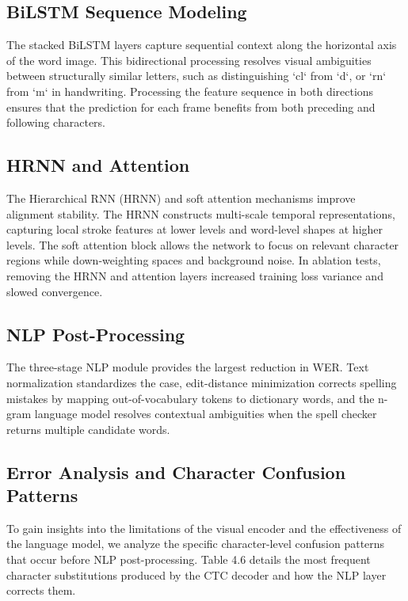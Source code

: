 \subsection{BiLSTM Sequence Modeling}
The stacked BiLSTM layers capture sequential context along the horizontal axis of the word image. This bidirectional processing resolves visual ambiguities between structurally similar letters, such as distinguishing `cl` from `d`, or `rn` from `m` in handwriting. Processing the feature sequence in both directions ensures that the prediction for each frame benefits from both preceding and following characters.

\subsection{HRNN and Attention}
The Hierarchical RNN (HRNN) and soft attention mechanisms improve alignment stability. The HRNN constructs multi-scale temporal representations, capturing local stroke features at lower levels and word-level shapes at higher levels. The soft attention block allows the network to focus on relevant character regions while down-weighting spaces and background noise. In ablation tests, removing the HRNN and attention layers increased training loss variance and slowed convergence.

\subsection{NLP Post-Processing}
The three-stage NLP module provides the largest reduction in WER. Text normalization standardizes the case, edit-distance minimization corrects spelling mistakes by mapping out-of-vocabulary tokens to dictionary words, and the n-gram language model resolves contextual ambiguities when the spell checker returns multiple candidate words.

\subsection{Error Analysis and Character Confusion Patterns}
To gain insights into the limitations of the visual encoder and the effectiveness of the language model, we analyze the specific character-level confusion patterns that occur before NLP post-processing. Table 4.6 details the most frequent character substitutions produced by the CTC decoder and how the NLP layer corrects them.

